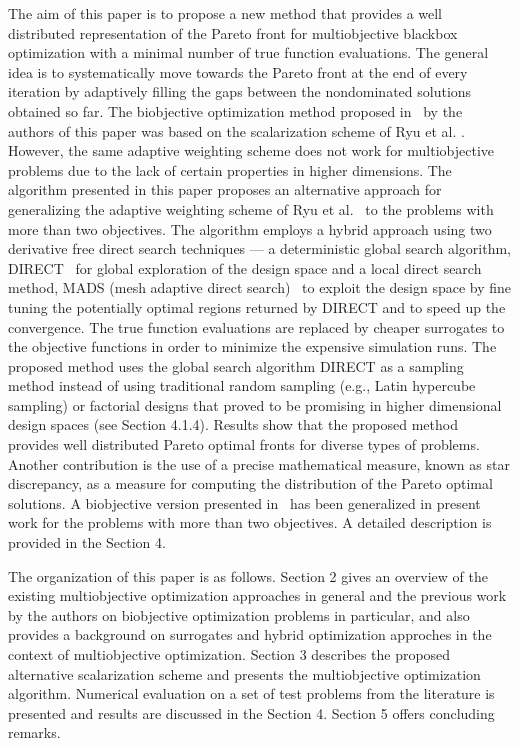 The aim of this paper is to propose a new method that provides a well 
distributed representation of the Pareto front for multiobjective blackbox 
optimization with a minimal number of true function evaluations. 
The general idea is to systematically move towards the Pareto front at the end
of every iteration by adaptively filling the gaps between the nondominated
solutions obtained so far. The biobjective optimization method proposed in
\DWC\ by the authors of this paper was based on the scalarization scheme of Ryu
et al. \RKW. However, the same adaptive weighting scheme does not work for
multiobjective problems due to the lack of certain properties in higher
dimensions. The algorithm presented in this paper proposes an alternative
approach for generalizing the adaptive weighting scheme of Ryu et al. \RKW\ to
the problems with more than two objectives. The algorithm employs a hybrid
approach using two derivative free direct search techniques --- a deterministic
global search algorithm, DIRECT \JPS\ for global exploration of the design
space and a local direct search method, MADS (mesh adaptive direct search) \AD\
to exploit the design space by fine tuning the potentially optimal regions
returned by DIRECT and to speed up the convergence.  The true function
evaluations are replaced by cheaper surrogates to the objective
functions in order to minimize the expensive simulation runs. The proposed 
method uses the global search algorithm DIRECT as a sampling
method instead of using traditional random sampling (e.g., Latin hypercube 
sampling) or factorial designs that  proved to be promising in higher dimensional 
design spaces (see Section 4.1.4). Results show that the proposed method provides 
well distributed Pareto optimal fronts for diverse types of problems. 
Another contribution is the use of a precise mathematical measure, known 
as star discrepancy, as a measure for computing the distribution of the 
Pareto optimal solutions. A biobjective version presented in \DWC\ has been 
generalized in present work for the problems with more than two objectives. A
detailed description is provided in the Section 4.  

The organization of this paper is as follows. Section 2 gives an overview  
of the existing multiobjective optimization approaches in general and the 
previous work by the authors on biobjective optimization problems in particular, 
and also provides a background on surrogates and hybrid optimization approches 
in the context of multiobjective optimization. Section 3 describes the proposed  
alternative scalarization scheme and presents the multiobjective optimization 
algorithm. Numerical evaluation on a set of test problems from the literature 
is presented and results are discussed in the Section 4. Section 5 offers 
concluding remarks.
 
